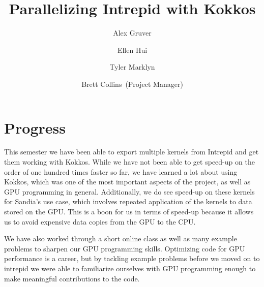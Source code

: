 \documentclass{hmcclinic}
\title{Parallelizing Intrepid with Kokkos}
\author{Alex Gruver \and Ellen Hui \and Tyler Marklyn \and Brett Collins~(Project Manager)}
\begin{document}





\maketitle

\mainmatter




\section*{Progress}
This semester we have been able to export multiple kernels from Intrepid and get
them working with Kokkos. While we have not been able to get speed-up on the
order of one hundred times faster so far, we have learned a lot about using
Kokkos, which was one of the most important aspects of the project, as well as
GPU programming in general. Additionally, we do see speed-up on these kernels
for Sandia's use case, which involves repeated application of the kernels to
data stored on the GPU. This is a boon for us in terms of speed-up because it
allows us to avoid expensive data copies from the GPU to the CPU.

We have also worked through a short online class as well as many example
problems to sharpen our GPU programming skills. Optimizing code for GPU
performance is a career, but by tackling example problems before we moved on to
intrepid we were able to familiarize ourselves with GPU programming enough to
make meaningful contributions to the code.
\end{document}
